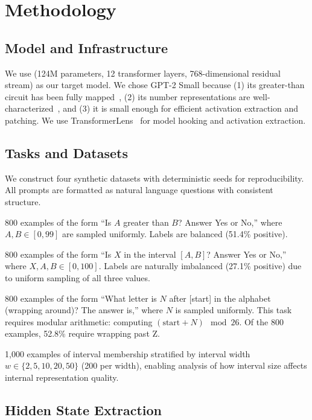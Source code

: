 \section{Methodology}
\label{sec:methodology}

\subsection{Model and Infrastructure}

We use \gptsmall (124M parameters, 12 transformer layers, 768-dimensional residual stream) as our target model. We chose GPT-2 Small because (1) its greater-than circuit has been fully mapped~\citep{hanna2023how}, (2) its number representations are well-characterized~\citep{levy2024language}, and (3) it is small enough for efficient activation extraction and patching. We use TransformerLens~\citep{elhage2021mathematical} for model hooking and activation extraction.

\subsection{Tasks and Datasets}
\label{sec:datasets}

We construct four synthetic datasets with deterministic seeds for reproducibility. All prompts are formatted as natural language questions with consistent structure.

 800 examples of the form ``Is $A$ greater than $B$? Answer Yes or No,'' where $A, B \in [0, 99]$ are sampled uniformly. Labels are balanced (51.4\% positive).

 800 examples of the form ``Is $X$ in the interval $[A, B]$? Answer Yes or No,'' where $X, A, B \in [0, 100]$. Labels are naturally imbalanced (27.1\% positive) due to uniform sampling of all three values.

 800 examples of the form ``What letter is $N$ after [start] in the alphabet (wrapping around)? The answer is,'' where $N$ is sampled uniformly. This task requires modular arithmetic: computing $(\text{start} + N) \mod 26$. Of the 800 examples, 52.8\% require wrapping past Z.

 1{,}000 examples of interval membership stratified by interval width $w \in \{2, 5, 10, 20, 50\}$ (200 per width), enabling analysis of how interval size affects internal representation quality.

\subsection{Hidden State Extraction}

